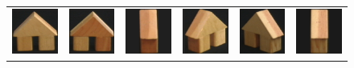 \begin{figure}[p]
\begin{tabular}{cccccc}
\includegraphics[width=2cm]{coil/beeld-42.eps} &
\includegraphics[width=2cm]{coil/beeld-43.eps} &
\includegraphics[width=2cm]{coil/beeld-44.eps} &
\includegraphics[width=2cm]{coil/beeld-45.eps} &
\includegraphics[width=2cm]{coil/beeld-46.eps} &
\includegraphics[width=2cm]{coil/beeld-47.eps} \\


\end{tabular}
\end{figure}
